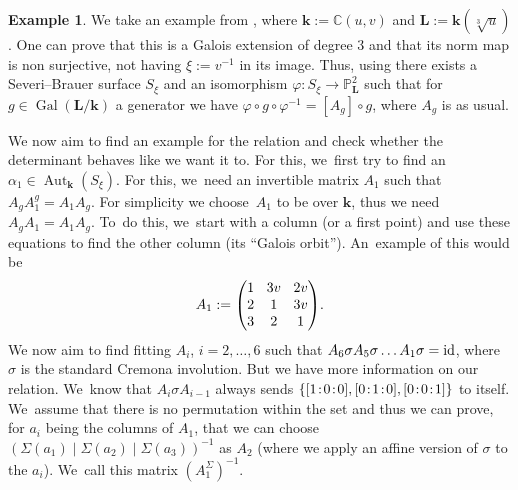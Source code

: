 \documentclass[JEP,XML,SOM,Unicode,NoFloatCountersInSection, NoEqCountersInSection,published]{cedram}
\newcommand{\id}{\textup{id}}
\newcommand{\sep}{\mkern2mu{:}\mkern2mu}
\DeclareMathOperator{\Gal}{Gal}
\theoremstyle{definition}
\newtheorem{example}[theorem]{Example}
\newcommand{\kk}{{\boldsymbol{k}}}
\newcommand{\LL}{{\boldsymbol{L}}}
\DeclareMathOperator{\Aut}{Aut}
\begin{document}
\begin{example}
We take an example from \cite[Cor.\,2.3.6]{BSY}, where $\kk := \mathbb{C}(u,v)$ and $\LL := \kk(\sqrt[3]{u})$. One can prove that this is a Galois extension of degree $3$ and that its norm map is non surjective, not having $\xi := v^{-1}$ in its image. Thus, using {\cite[Lem.\,2.3.3]{BSY}} there exists a Severi--Brauer surface $S_{\xi}$ and an isomorphism $\varphi \colon S_{\xi} \to \mathbb{P}_{\LL}^2 $ such that for $g \in \Gal(\LL/ \kk)$ a generator we have $\varphi \circ g \circ \varphi^{-1} = [A_g] \circ g$, where $A_g$ is as usual.

We now aim to find an example for the relation and check whether the determinant behaves like we want it to. For this, we~first try to find an $\alpha_1 \in \Aut_{\kk}(S_{\xi})$. For this, we~need an invertible matrix $A_1$ such that $A_gA_1^g = A_1A_g$. For simplicity we choose~$A_1$ to be over $\kk$, thus we need $A_gA_1 = A_1A_g$. To~do this, we~start with a column (or a first point) and use these equations to find the other column (its ``Galois orbit''). An~example of this would be
\[\arraycolsep4.5pt
A_1 := \begin{pmatrix}
1 & 3v & 2v \\
2 & 1 & 3v \\
3 & 2 & 1 \\
\end{pmatrix}\!.
\]
We now aim to find fitting $A_i$, $i=2, \dots , 6$ such that $A_6 \sigma A_5 \sigma \dots A_1 \sigma = \id$, where $\sigma$ is the standard Cremona involution. But we have more information on our relation. We~know that $A_i \sigma A_{i-1}$ always sends $\{ [1\sep 0\sep 0], [0\sep 1\sep 0], [0\sep 0\sep 1] \}$ to itself. We~assume that there is no permutation within the set and thus we can prove, for $a_{i}$ being the columns of $A_1$, that we can choose $(\Sigma(a_{1}) \mid \Sigma(a_{2}) \mid \Sigma(a_{3}) )^{-1}$ as $A_2$ (where we apply an affine version of $\sigma$ to the $a_i$). We~call this matrix $(A_1^{\Sigma})^{-1}$.


\end{example}
\end{document}

